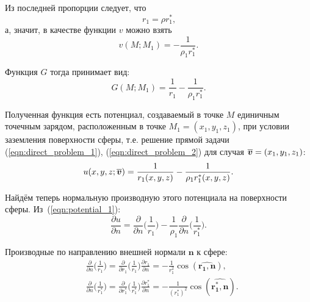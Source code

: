 Из последней пропорции следует, что
\[
r_1 = \rho r_1^*\text{,}
\]
а, значит, в качестве функции $v$ можно взять
\begin{equation}
	v(M; M_1) = - \frac{1}{ \rho_1 r_1^*}\text{.}
\end{equation}

Функция $G$ тогда принимает вид:
\begin{equation}
	G(M;M_1) =
	\frac{1}{r_1} -
	\frac{1}{\rho_1 r_1^*}
	\text{.}
\end{equation}

Полученная функция есть потенциал, создаваемый в точке $M$ единичным точечным зарядом, расположенным в точке $M_1=(x_1,y_1,z_1)$, при условии заземления поверхности сферы, т.е. решение прямой задачи (\ref{eqn:direct_problem_1}), (\ref{eqn:direct_problem_2}) для случая $\boldsymbol{\overline{v}}=(x_1,y_1,z_1)$:
\begin{equation}
	u(x,y,z; \boldsymbol{\overline{v}}) = 
	\frac{1}{r_1(x,y,z)} -
	\frac{1}{\rho_1 r_1^*(x,y,z)}
	\text{.}\label{eqn:potential_1}
\end{equation}

Найдём теперь нормальную производную этого потенциала на поверхности сферы. Из~(\ref{eqn:potential_1}):
\begin{equation}
	\frac{\partial u}{\partial n}
	=
	\frac{\partial}{\partial n}
	\Big(
	\frac{1}{r_1}
	\Big)
	- \frac{1}{\rho_1}
	\frac{\partial}{\partial n}
	\Big(
	\frac{1}{r_1^*}
	\Big)
	\text{.}\label{eqn:derivative_1}
\end{equation}

Производные по направлению внешней нормали $\mathbf{n}$ к сфере:
\begin{equation}
	\begin{aligned}
		&\frac{\partial}{\partial n}
		\Big(
		\frac{1}{r_{1}}
		\Big)
		=
		\frac{\partial}{\partial r_{1}}
		\Big(
		\frac{1}{r_{1}}
		\Big)
		\frac{\partial r_{1}}{\partial n}
		=
		-\frac{1}{r_{1}^2}
		\cos{(\widehat{\mathbf{r_{1}}, \mathbf{n}})}
		\text{,}\\[20pt]
		&\frac{\partial}{\partial n}
		\Big(
		\frac{1}{r_{1}^*}
		\Big)
		=
		\frac{\partial}{\partial r_{1}^*}
		\Big(
		\frac{1}{r_{1}^*}
		\Big)
		\frac{\partial r_{1}^*}{\partial n}
		=
		-\frac{1}{(r_{1}^*)^2}
		\cos{(\widehat{\mathbf{r_{1}^*}, \mathbf{n}})}
		\text{.}
		\label{partials}
	\end{aligned}
\end{equation}

